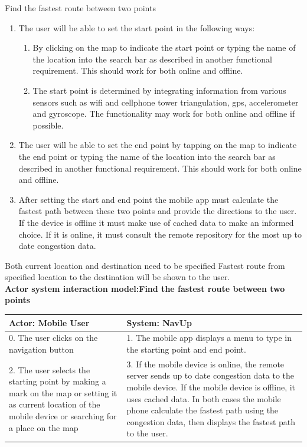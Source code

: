 \FuncReq
{Find the fastest route between two points}%
{
  \begin{enumerate}
    \item The user will be able to set the start point in the following ways:
      \begin{enumerate}
        \item By clicking on the map to indicate the start point or typing the name of the location into the search bar as described in another functional requirement. This should work for both online and offline.
        \item The start point is determined by integrating information from various sensors such as wifi and cellphone tower triangulation, gps, accelerometer and gyroscope. The functionality may work for both online and offline if possible.
      \end{enumerate}

    \item The user will be able to set the end point by tapping on the map to indicate the end point or typing the name of the location into the search bar as described in another functional requirement. This should work for both online and offline.
    \item After setting the start and end point the mobile app must calculate the fastest path between these two points and provide the directions to the user. If the device is offline it must make use of cached data to make an informed choice. If it is online, it must consult the remote repository for the most up to date congestion data.
  \end{enumerate}
  \mbox{}%
}
{Both current location and destination need to be specified}
{Fastest route from specified location to the destination will be shown to the user.}
    \\
    \textbf{Actor system interaction model:Find the fastest route between two points }\\
    \begin{tabular}{ | p{6cm} | p{6cm} |}
    \hline
    Actor: Mobile User & System: NavUp \\ \hline
    0. The user clicks on the navigation button & 1. The mobile app displays a menu to type in the starting point and end point.\\ \hline
    2. The user selects the starting point by making a mark on the map or setting it as current location of the mobile device or searching for a place on the map & 3. If the mobile device is online, the remote server sends up to date congestion data to the mobile device. If the mobile device is offline, it uses cached data. In both cases the mobile phone calculate the fastest path using the congestion data, then displays the fastest path to the user.\\ \hline
    \end{tabular}
\\
\bigskip

